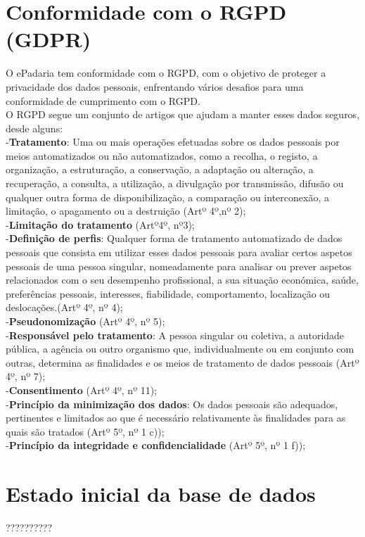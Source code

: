 \section{Conformidade com o RGPD (GDPR)}
O ePadaria tem conformidade com o RGPD, com o objetivo de proteger a privacidade dos dados pessoais, enfrentando vários desafios para uma conformidade de cumprimento com o RGPD.\\
O RGPD segue um conjunto de artigos que ajudam a manter esses dados seguros, desde alguns:\\
-\textbf{Tratamento}: Uma ou mais operações efetuadas sobre os dados pessoais por meios automatizados ou não automatizados, como a recolha, o registo, a organização, a estruturação, a
conservação, a adaptação ou alteração, a recuperação, a consulta, a utilização,
a divulgação por transmissão, difusão ou qualquer outra forma de
disponibilização, a comparação ou interconexão, a limitação, o apagamento
ou a destruição (Artº 4º,nº 2);\\
-\textbf{Limitação do tratamento} (Artº4º, nº3);\\
-\textbf{Definição de perfis}: Qualquer forma de tratamento automatizado de dados pessoais que consista
em utilizar esses dados pessoais para avaliar certos aspetos pessoais de uma
pessoa singular, nomeadamente para analisar ou prever aspetos relacionados
com o seu desempenho profissional, a sua situação económica, saúde,
preferências pessoais, interesses, fiabilidade, comportamento, localização ou
deslocações.(Artº 4º, nº 4); \\
-\textbf{Pseudonomização} (Artº 4º, nº 5);\\
-\textbf{Responsável pelo tratamento}: A pessoa singular ou coletiva, a autoridade pública, a agência ou outro organismo que, individualmente ou em conjunto com outras, determina as finalidades e os meios de tratamento de dados pessoais (Artº 4º, nº 7); \\
-\textbf{Consentimento} (Artº 4º, nº 11);\\
-\textbf{Princípio da minimização dos dados}: Os dados pessoais são adequados, pertinentes e limitados ao que é necessário relativamente às finalidades para as quais são tratados (Artº 5º, nº 1 c));\\
-\textbf{Princípio da integridade e confidencialidade} (Artº 5º, nº 1 f));\\

\section{Estado inicial da base de dados}
??????????
